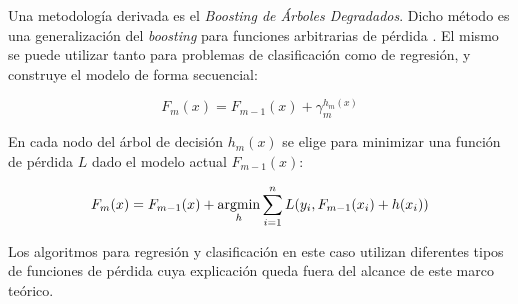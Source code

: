 \begin{spacing}{1.5}
Una metodología derivada es el \emph{Boosting de Árboles Degradados}. Dicho método es una generalización del \emph{boosting} para funciones arbitrarias de pérdida \cite{smolyakov}. El mismo se puede utilizar tanto para problemas de clasificación como de regresión, y construye el modelo de forma secuencial:

\[ F_m(x) = F_{m-1}(x) + \gamma_m^{h_m(x)} \]

En cada nodo del árbol de decisión \(h_m(x)\) se elige para minimizar una función de pérdida \(L\) dado el modelo actual \(F_{m-1}(x)\):

\[ F_m(x) = F_{m-1}(x) + \operatorname*{argmin}_h \sum_{i=1}^n L(y_i, F_{m-1}(x_i) + h(x_i) )\]

Los algoritmos para regresión y clasificación en este caso utilizan diferentes tipos de funciones de pérdida cuya explicación queda fuera del alcance de este marco teórico. 


\end{spacing}
